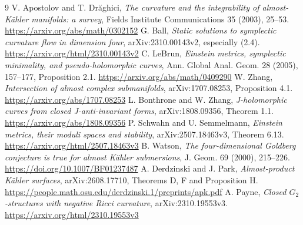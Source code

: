 \documentclass[11pt]{article}
\begin{document}
\begin{thebibliography}{9}
 V. Apostolov and T. Dr\u aghici, \emph{The curvature and the integrability of almost-K\"ahler manifolds: a survey}, Fields Institute Communications 35 (2003), 25--53. \url{https://arxiv.org/abs/math/0302152}
 G. Ball, \emph{Static solutions to symplectic curvature flow in dimension four}, arXiv:2310.00143v2, especially (2.4). \url{https://arxiv.org/html/2310.00143v2}
 C. LeBrun, \emph{Einstein metrics, symplectic minimality, and pseudo-holomorphic curves}, Ann. Global Anal. Geom. 28 (2005), 157--177, Proposition 2.1. \url{https://arxiv.org/abs/math/0409290}
 W. Zhang, \emph{Intersection of almost complex submanifolds}, arXiv:1707.08253, Proposition 4.1. \url{https://arxiv.org/abs/1707.08253}
 L. Bonthrone and W. Zhang, \emph{J-holomorphic curves from closed J-anti-invariant forms}, arXiv:1808.09356, Theorem 1.1. \url{https://arxiv.org/abs/1808.09356}
 P. Schwahn and U. Semmelmann, \emph{Einstein metrics, their moduli spaces and stability}, arXiv:2507.18463v3, Theorem 6.13. \url{https://arxiv.org/html/2507.18463v3}
 B. Watson, \emph{The four-dimensional Goldberg conjecture is true for almost K\"ahler submersions}, J. Geom. 69 (2000), 215--226. \url{https://doi.org/10.1007/BF01237487}
 A. Derdzinski and J. Park, \emph{Almost-product K\"ahler surfaces}, arXiv:2608.17710, Theorems D, F and Proposition H. \url{https://people.math.osu.edu/derdzinski.1/preprints/apk.pdf}
 A. Payne, \emph{Closed $G_2$-structures with negative Ricci curvature}, arXiv:2310.19553v3. \url{https://arxiv.org/html/2310.19553v3}
\end{thebibliography}
\end{document}

